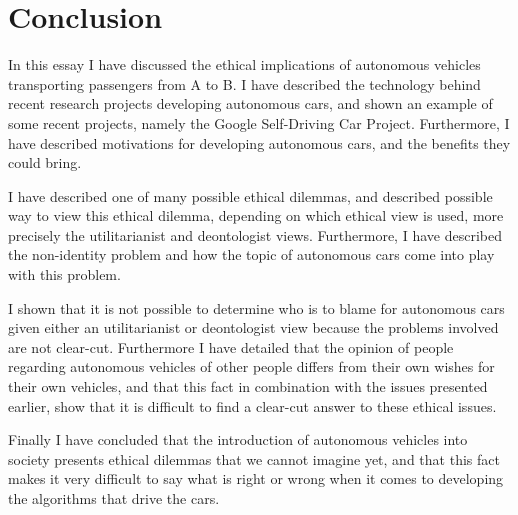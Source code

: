 \chapter{Conclusion}

In this essay I have discussed the ethical implications of autonomous vehicles transporting passengers from A to B. I have described the technology behind recent research projects developing autonomous cars, and shown an example of some recent projects, namely the Google Self-Driving Car Project. Furthermore, I have described motivations for developing autonomous cars, and the benefits they could bring.  

I have described one of many possible ethical dilemmas, and described possible way to view this ethical dilemma, depending on which ethical view is used, more precisely the utilitarianist and deontologist views. Furthermore, I have described the non-identity problem and how the topic of autonomous cars come into play with this problem.

I shown that it is not possible to determine who is to blame for autonomous cars given either an utilitarianist or deontologist view because the problems involved are not clear-cut. Furthermore I have detailed that the opinion of people regarding autonomous vehicles of other people differs from their own wishes for their own vehicles, and that this fact in combination with the issues presented earlier, show that it is difficult to find a clear-cut answer to these ethical issues. 

Finally I have concluded that the introduction of autonomous vehicles into society presents ethical dilemmas that we cannot imagine yet, and that this fact makes it very difficult to say what is right or wrong when it comes to developing the algorithms that drive the cars. 
